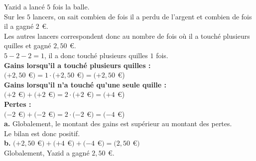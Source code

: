 \documentclass[a4paper,12pt]{report}
\begin{document}
\begin{Correction}
\begin{EXO}{}{}
 
Yazid a lancé $5$ fois la balle.\\
Sur les $5$ lancers, on sait combien de fois il a perdu de l'argent et combien de fois il a gagné $2~$\,\euro{}.\\
Les autres lancers correspondent donc au nombre de fois où il a touché plusieurs quilles et gagné $2{,}50~$\,\euro{}.\\
$5-2-2 = 1$,
il a donc touché plusieurs quilles $1$ fois.\\
\textbf{Gains lorsqu'il a touché plusieurs quilles :}\\
$(+2{,}50~$\,\euro{}$) = 1\cdot (+2{,}50~$\,\euro{}$) = (+2{,}50~$\,\euro{})\\
\textbf{Gains lorsqu'il n'a touché qu'une seule quille :}\\
$(+2~$\,\euro{}$)+(+2~$\,\euro{}$) = 2\cdot (+2~$\,\euro{}$) = (+4~$\,\euro{})\\
\textbf{Pertes :}\\
$(-2~$\,\euro{}$)+(-2~$\,\euro{}$) = 2\cdot (-2~$\,\euro{}$) = (-4~$\,\euro{})\\
\textbf {a.}  Globalement, le montant des gains est supérieur au montant des pertes.\\ 
{\color[HTML]{f15929}Le bilan est donc positif.}\\
\textbf {b.} 
$(+2{,}50~$\,\euro{}$)+(+4~$\,\euro{}$)+(-4~$\,\euro{}$) = (2{,}50~$\,\euro{}$)$\\
{\color[HTML]{f15929}Globalement, Yazid a gagné $2{,}50~$\,\euro{}.}

\end{EXO}

\begin{EXO}{}{}


\end{EXO}
\end{Correction}
\end{document}
